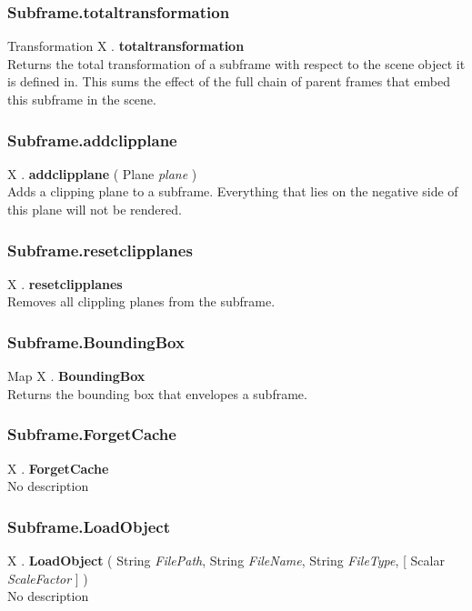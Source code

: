 \documentclass[10pt]{book}
\begin{document}
\subsubsection{Subframe.totaltransformation \label{F:Subframe:totaltransformation}}
Transformation X . \textbf{totaltransformation} \\
Returns the total transformation of a subframe with respect to the scene object it is defined in. This sums the effect of the full chain of parent frames that embed this subframe in the scene.

\subsubsection{Subframe.addclipplane \label{F:Subframe:addclipplane}}
X . \textbf{addclipplane} ( Plane \textit{plane} ) \\
Adds a clipping plane to a subframe. Everything that lies on the negative side of this plane will not be rendered.

\subsubsection{Subframe.resetclipplanes \label{F:Subframe:resetclipplanes}}
X . \textbf{resetclipplanes} \\
Removes all clippling planes from the subframe.

\subsubsection{Subframe.BoundingBox \label{F:Subframe:BoundingBox}}
Map X . \textbf{BoundingBox} \\
Returns the bounding box that envelopes a subframe.

\subsubsection{Subframe.ForgetCache \label{F:Subframe:ForgetCache}}
X . \textbf{ForgetCache} \\
No description

\subsubsection{Subframe.LoadObject \label{F:Subframe:LoadObject}}
X . \textbf{LoadObject} ( String \textit{FilePath}, String \textit{FileName}, String \textit{FileType},  [ Scalar \textit{ScaleFactor} ] ) \\
No description
\end{document}
